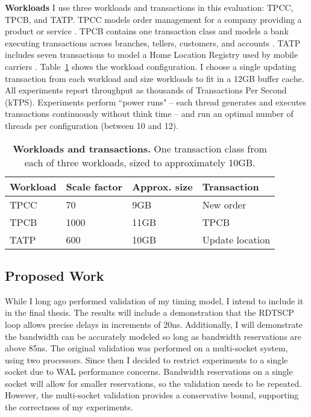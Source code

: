 \textbf{Workloads}
I use three workloads and transactions in this evaluation: TPCC, TPCB, and TATP.
TPCC models order management for a company providing a product or service \cite{TPCC}.
TPCB contains one transaction class and models a bank executing transactions across branches, tellers, customers, and accounts \cite{TPCB}.
TATP includes seven transactions to model a Home Location Registry used by mobile carriers \cite{TATP}.
Table~\ref{table::Workloads} shows the workload configuration.
I choose a single updating transaction from each workload and size workloads to fit in a 12GB buffer cache.
All experiments report throughput as thousands of Transactions Per Second (kTPS).
Experiments perform ``power runs" -- each thread generates and executes transactions continuously without think time -- and run an optimal number of threads per configuration (between 10 and 12).

\begin{table}
  \centering
  \begin{tabular}{l l l l}
    \hline
    Workload & Scale factor & Approx. size & Transaction \\
    \hline \hline
    TPCC & 70 & 9GB & New order \\
    TPCB & 1000 & 11GB & TPCB \\
    TATP & 600 & 10GB & Update location \\
    \hline
  \end{tabular}
  \caption{\textbf{Workloads and transactions.}  One transaction class from each of three workloads, sized to approximately 10GB.}
  \label{table::Workloads}
\end{table}

\subsection{Proposed Work}
\label{sec:OLTP_design:Methodology:Proposed}

While I long ago performed validation of my timing model, I intend to include it in the final thesis.
The results will include a demonstration that the RDTSCP loop allows precise delays in increments of 20ns.
Additionally, I will demonstrate the bandwidth can be accurately modeled so long as bandwidth reservations are above 85ns.
The original validation was performed on a multi-socket system, using two processors.
Since then I decided to restrict experiments to a single socket due to WAL performance concerns.
Bandwidth reservations on a single socket will allow for smaller reservations, so the validation needs to be repeated.
However, the multi-socket validation provides a conservative bound, supporting the correctness of my experiments.

